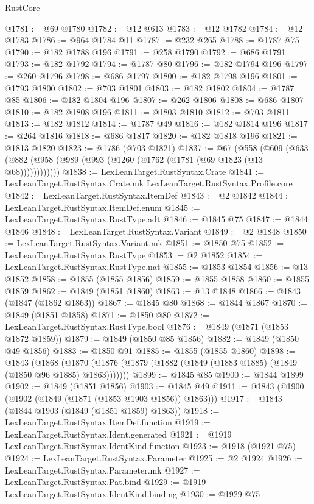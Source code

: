 \begin{lexlean}{RustCore}
\begin{coremodule}
@1781 := @69 @1780
@1782 := @12 @613
@1783 := @12 @1782
@1784 := @12 @1783
@1786 := @964 @1784 @11
@1787 := @232 @265
@1788 := @1787 @75
@1790 := @182 @1788 @196
@1791 := @258 @1790
@1792 := @686 @1791
@1793 := @182 @1792
@1794 := @1787 @80
@1796 := @182 @1794 @196
@1797 := @260 @1796
@1798 := @686 @1797
@1800 := @182 @1798 @196
@1801 := @1793 @1800
@1802 := @703 @1801
@1803 := @182 @1802
@1804 := @1787 @85
@1806 := @182 @1804 @196
@1807 := @262 @1806
@1808 := @686 @1807
@1810 := @182 @1808 @196
@1811 := @1803 @1810
@1812 := @703 @1811
@1813 := @182 @1812
@1814 := @1787 @49
@1816 := @182 @1814 @196
@1817 := @264 @1816
@1818 := @686 @1817
@1820 := @182 @1818 @196
@1821 := @1813 @1820
@1823 := @1786 (@703 @1821)
@1837 := @67
    (@558 (@609 (@633 (@882 (@958 (@989 (@993 (@1260 (@1762 (@1781 (@69 @1823 (@13 @68))))))))))))
@1838 := LexLeanTarget.RustSyntax.Crate
@1841 := LexLeanTarget.RustSyntax.Crate.mk LexLeanTarget.RustSyntax.Profile.core
@1842 := LexLeanTarget.RustSyntax.ItemDef
@1843 := @2 @1842
@1844 := LexLeanTarget.RustSyntax.ItemDef.enum
@1845 := LexLeanTarget.RustSyntax.RustType.adt
@1846 := @1845 @75
@1847 := @1844 @1846
@1848 := LexLeanTarget.RustSyntax.Variant
@1849 := @2 @1848
@1850 := LexLeanTarget.RustSyntax.Variant.mk
@1851 := @1850 @75
@1852 := LexLeanTarget.RustSyntax.RustType
@1853 := @2 @1852
@1854 := LexLeanTarget.RustSyntax.RustType.nat
@1855 := @1853 @1854
@1856 := @13 @1852
@1858 := @1855 (@1855 @1856)
@1859 := @1855 @1858
@1860 := @1855 @1859
@1862 := @1849 (@1851 @1860)
@1863 := @13 @1848
@1866 := @1843 (@1847 (@1862 @1863))
@1867 := @1845 @80
@1868 := @1844 @1867
@1870 := @1849 (@1851 @1858)
@1871 := @1850 @80
@1872 := LexLeanTarget.RustSyntax.RustType.bool
@1876 := @1849 (@1871 (@1853 @1872 @1859))
@1879 := @1849 (@1850 @85 @1856)
@1882 := @1849 (@1850 @49 @1856)
@1883 := @1850 @91
@1885 := @1855 (@1855 @1860)
@1898 := @1843
    (@1868 (@1870 (@1876 (@1879 (@1882 (@1849 (@1883 @1885) (@1849 (@1850 @96 @1885) @1863)))))))
@1899 := @1845 @85
@1900 := @1844 @1899
@1902 := @1849 (@1851 @1856)
@1903 := @1845 @49
@1911 := @1843 (@1900 (@1902 (@1849 (@1871 (@1853 @1903 @1856)) @1863)))
@1917 := @1843 (@1844 @1903 (@1849 (@1851 @1859) @1863))
@1918 := LexLeanTarget.RustSyntax.ItemDef.function
@1919 := LexLeanTarget.RustSyntax.Ident.generated
@1921 := @1919 LexLeanTarget.RustSyntax.IdentKind.function
@1923 := @1918 (@1921 @75)
@1924 := LexLeanTarget.RustSyntax.Parameter
@1925 := @2 @1924
@1926 := LexLeanTarget.RustSyntax.Parameter.mk
@1927 := LexLeanTarget.RustSyntax.Pat.bind
@1929 := @1919 LexLeanTarget.RustSyntax.IdentKind.binding
@1930 := @1929 @75

\end{coremodule}
\end{lexlean}
